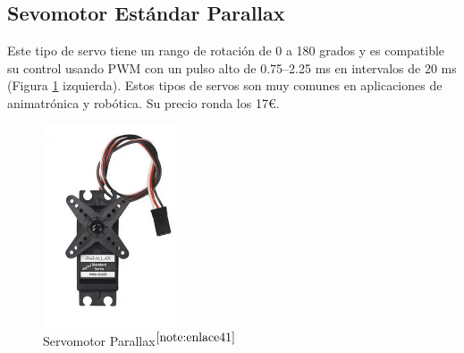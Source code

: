 \setcounter{footnote}{40} %


\subsection{Sevomotor Estándar Parallax}
Este tipo de servo tiene un rango de rotación de 0 a 180 grados y es compatible su control usando \ac{PWM} con un pulso alto de 0.75–2.25 ms en intervalos de 20 ms (Figura \ref{fig:parallax} izquierda). Estos tipos de servos son muy comunes en aplicaciones de animatrónica y robótica. Su precio ronda los 17€.



\begin{figure} [h!]
	\begin{center}
		\includegraphics[width=4cm]{figs/parallax.png}
	\end{center}
	\caption{Servomotor Parallax$^{\ref{note:enlace41}}$} 
	\label{fig:parallax}
\end{figure}\


